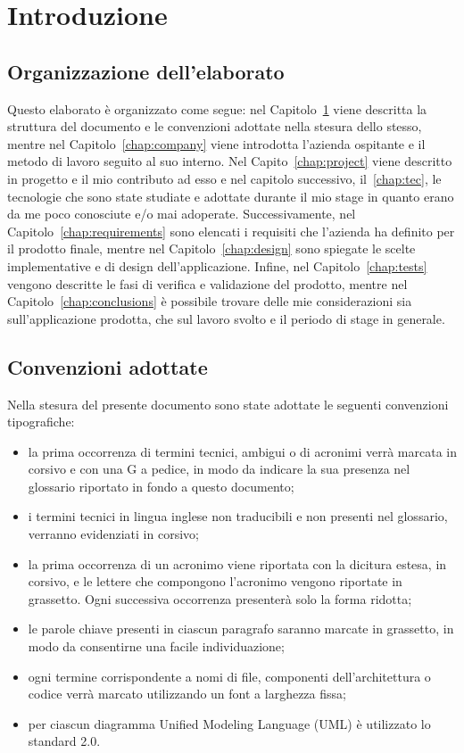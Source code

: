 \mainmatter

\chapter{Introduzione}\label{chap:intro}

\section{Organizzazione dell'elaborato}
Questo elaborato è organizzato come segue: nel Capitolo~\ref{chap:intro} viene
descritta la struttura del documento e le convenzioni adottate nella stesura
dello stesso, mentre nel Capitolo~\ref{chap:company} viene introdotta l'azienda
ospitante e il metodo di lavoro seguito al suo interno. Nel
Capito~\ref{chap:project} viene descritto in progetto e il mio contributo ad
esso e nel capitolo successivo, il~\ref{chap:tec}, le tecnologie che sono state
studiate e adottate durante il mio stage in quanto erano da me poco conosciute 
e/o mai adoperate. Successivamente, nel
Capitolo~\ref{chap:requirements} sono elencati i requisiti che l'azienda ha
definito per il prodotto finale, mentre nel Capitolo~\ref{chap:design} sono
spiegate le scelte implementative e di design dell'applicazione. Infine, nel Capitolo~\ref{chap:tests}
vengono descritte le fasi di verifica e validazione del prodotto, mentre nel
Capitolo~\ref{chap:conclusions} è possibile trovare delle mie considerazioni
sia sull'applicazione prodotta, che sul lavoro svolto e il periodo di stage in
generale.

\section{Convenzioni adottate}
Nella stesura del presente documento sono state adottate le seguenti convenzioni
tipografiche:
\begin{itemize}
	\item la prima occorrenza di termini tecnici, ambigui o di acronimi verrà marcata in corsivo	e con una G a pedice, in modo da indicare la sua presenza nel glossario riportato in fondo a questo documento;
	\item i termini tecnici in lingua inglese non traducibili e non presenti nel glossario, verranno evidenziati in corsivo;
	\item la prima occorrenza di un acronimo viene riportata con la dicitura estesa, in
	corsivo, e le lettere che compongono l’acronimo vengono riportate in grassetto. Ogni successiva occorrenza presenterà solo la forma ridotta;
	\item le parole chiave presenti in ciascun paragrafo saranno marcate in grassetto, in modo da consentirne una facile individuazione;
	\item ogni termine corrispondente a nomi di file, componenti dell’architettura o codice verrà marcato utilizzando un font a larghezza fissa;
	\item per ciascun diagramma Unified Modeling Language (UML) è utilizzato lo
	standard 2.0.
\end{itemize}
